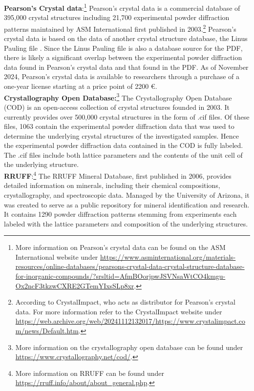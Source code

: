 \textbf{Pearson's Crystal data}:\footnote{More information on Pearson's crystal data can be found on the ASM International website under \url{https://www.asminternational.org/materials-resources/online-databases/pearsons-crystal-data-crystal-structure-database-for-inorganic-compounds/?srsltid=AfmBOorjpwJSVNsaWtCO4kmgu-Ox2ncF3tkzwCXRE2GTemYIxsSLp8xr}.} Pearson's crystal data is a commercial database of 395,000 crystal structures including 21,700 experimental powder diffraction patterns maintained by ASM International first published in 2003.\footnote{According to CrystalImpact, who acts as distributor for Pearson's crystal data. For more information refer to the CrystalImpact website under \url{https://web.archive.org/web/20241112132017/https://www.crystalimpact.com/news/Default.htm}. } Pearson's crystal data is based on the data of another crystal structure database, the Linus Pauling file \cite{kaduk2007}. Since the Linus Pauling file is also a database source for the PDF, there is likely a significant overlap between the experimental powder diffraction data found in Pearson's crystal data and that found in the PDF. As of November 2024, Pearson's crystal data is available to researchers through a purchase of a one-year license starting at a price point of 2200 \euro.\\

\textbf{Crystallography Open Database:}\footnote{More information on the crystallography open database can be found under \url{https://www.crystallography.net/cod/}.} The Crystallography Open Database (COD) is an open-access collection of crystal structures founded in 2003\cite{Graulis2009cod}. It currently provides over 500,000 crystal structures in the form of .cif files. Of these files, 1063 contain the experimental powder diffraction data that was used to determine the underlying crystal structures of the investigated samples. Hence the experimental powder diffraction data contained in the COD is fully labeled. The .cif files include both lattice parameters and the contents of the unit cell of the underlying structure. \\

\textbf{RRUFF}:\footnote{More information on RRUFF can be found under \url{https://rruff.info/about/about_general.php}.} The RRUFF Mineral Database, first published in 2006, provides detailed information on minerals, including their chemical compositions, crystallography, and spectroscopic data. Managed by the University of Arizona, it was created to serve as a public repository for mineral identification and research. It contains \num{1290} powder diffraction patterns stemming from experiments each labeled with the lattice parameters and composition of the underlying structures. \\

